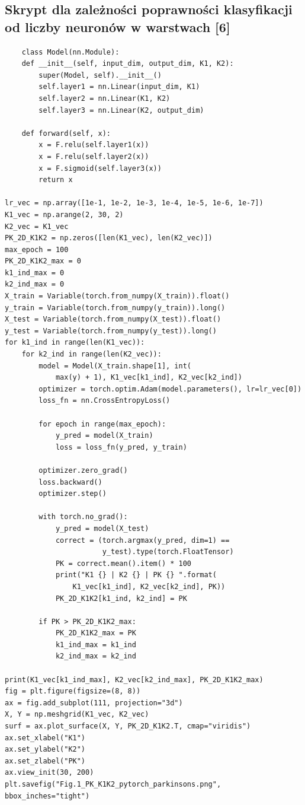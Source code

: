\documentclass{article}
\begin{document}
\subsection{Skrypt dla zależności poprawności klasyfikacji od liczby neuronów w warstwach [6]}
\begin{verbatim}
    class Model(nn.Module):
    def __init__(self, input_dim, output_dim, K1, K2):
        super(Model, self).__init__()
        self.layer1 = nn.Linear(input_dim, K1)
        self.layer2 = nn.Linear(K1, K2)
        self.layer3 = nn.Linear(K2, output_dim)

    def forward(self, x):
        x = F.relu(self.layer1(x))
        x = F.relu(self.layer2(x))
        x = F.sigmoid(self.layer3(x))
        return x

lr_vec = np.array([1e-1, 1e-2, 1e-3, 1e-4, 1e-5, 1e-6, 1e-7])
K1_vec = np.arange(2, 30, 2)
K2_vec = K1_vec
PK_2D_K1K2 = np.zeros([len(K1_vec), len(K2_vec)])
max_epoch = 100
PK_2D_K1K2_max = 0
k1_ind_max = 0
k2_ind_max = 0
X_train = Variable(torch.from_numpy(X_train)).float()
y_train = Variable(torch.from_numpy(y_train)).long()
X_test = Variable(torch.from_numpy(X_test)).float()
y_test = Variable(torch.from_numpy(y_test)).long()
for k1_ind in range(len(K1_vec)):
    for k2_ind in range(len(K2_vec)):
        model = Model(X_train.shape[1], int(
            max(y) + 1), K1_vec[k1_ind], K2_vec[k2_ind])
        optimizer = torch.optim.Adam(model.parameters(), lr=lr_vec[0])
        loss_fn = nn.CrossEntropyLoss()

        for epoch in range(max_epoch):
            y_pred = model(X_train)
            loss = loss_fn(y_pred, y_train)

        optimizer.zero_grad()
        loss.backward()
        optimizer.step()

        with torch.no_grad():
            y_pred = model(X_test)
            correct = (torch.argmax(y_pred, dim=1) ==
                       y_test).type(torch.FloatTensor)
            PK = correct.mean().item() * 100
            print("K1 {} | K2 {} | PK {} ".format(
                K1_vec[k1_ind], K2_vec[k2_ind], PK))
            PK_2D_K1K2[k1_ind, k2_ind] = PK

        if PK > PK_2D_K1K2_max:
            PK_2D_K1K2_max = PK
            k1_ind_max = k1_ind
            k2_ind_max = k2_ind

print(K1_vec[k1_ind_max], K2_vec[k2_ind_max], PK_2D_K1K2_max)
fig = plt.figure(figsize=(8, 8))
ax = fig.add_subplot(111, projection="3d")
X, Y = np.meshgrid(K1_vec, K2_vec)
surf = ax.plot_surface(X, Y, PK_2D_K1K2.T, cmap="viridis")
ax.set_xlabel("K1")
ax.set_ylabel("K2")
ax.set_zlabel("PK")
ax.view_init(30, 200)
plt.savefig("Fig.1_PK_K1K2_pytorch_parkinsons.png", bbox_inches="tight")
\end{verbatim}
\end{document}
